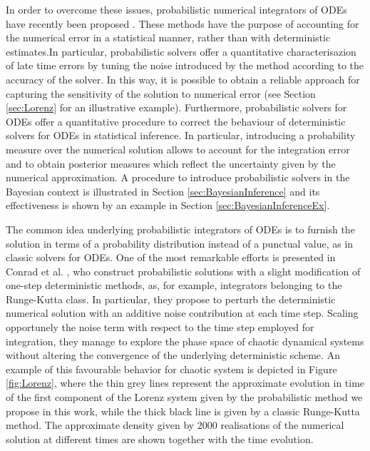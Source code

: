 \documentclass{siamart1116}
\numberwithin{theorem}{section}
\begin{document}
In order to overcome these issues, probabilistic numerical integrators of ODEs have recently been proposed \cite{CGS16, CCC16, KeH16}. These methods have the purpose of accounting for the numerical error in a statistical manner, rather than with deterministic estimates.In particular, probabilistic solvers offer a quantitative characterisazion of late time errors by tuning the noise introduced by the method according to the accuracy of the solver. In this way, it is possible to obtain a reliable approach for capturing the sensitivity of the solution to numerical error (see Section \ref{sec:Lorenz} for an illustrative example). Furthermore, probabilistic solvers for ODEs offer a quantitative procedure to correct the behaviour of deterministic solvers for ODEs in statistical inference. In particular, introducing a probability measure over the numerical solution allows to account for the integration error and to obtain posterior measures which reflect the uncertainty given by the numerical approximation. A procedure to introduce probabilistic solvers in the Bayesian context is illustrated in Section \ref{sec:BayesianInference} and its effectiveness is shown by an example in Section \ref{sec:BayesianInferenceEx}.

The common idea underlying probabilistic integrators of ODEs is to furnish the solution in terms of a probability distribution instead of a punctual value, as in classic solvers for ODEs. One of the most remarkable efforts is presented in Conrad et al. \cite{CGS16}, who construct probabilistic solutions with a slight modification of one-step deterministic methods, as, for example, integrators belonging to the Runge-Kutta class. In particular, they propose to perturb the deterministic numerical solution with an additive noise contribution at each time step. Scaling opportunely the noise term with respect to the time step employed for integration, they manage to explore the phase space of chaotic dynamical systems without altering the convergence of the underlying deterministic scheme. An example of this favourable behavior for chaotic system is depicted in Figure \ref{fig:Lorenz}, where the thin grey lines represent the approximate evolution in time of the first component of the Lorenz system given by the probabilistic method we propose in this work, while the thick black line is given by a classic Runge-Kutta method. The approximate density given by $2000$ realisations of the numerical solution at different times are shown together with the time evolution.
\end{document}
